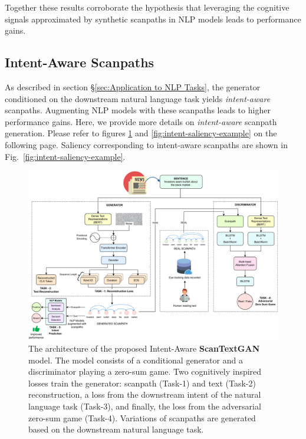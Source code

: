 Together these results corroborate the hypothesis that leveraging the cognitive signals approximated by synthetic scanpaths in NLP models leads to performance gains.



\subsection{Intent-Aware Scanpaths}
\label{sec:appendix_intent_aware_scanpaths}
As described in section \S\ref{sec:Application to NLP Tasks}, the generator conditioned on the downstream natural language task yields \textit{intent-aware} scanpaths. Augmenting NLP models with these scanpaths leads to higher performance gains. Here, we provide more details on \textit{intent-aware} scanpath generation.
Please refer to figures \ref{fig:intent-model} and \ref{fig:intent-saliency-example} on the following page. Saliency corresponding to intent-aware scanpaths are shown in Fig.~\ref{fig:intent-saliency-example}.



\begin{figure}[!t]
    \centering
    \includegraphics[width=\textwidth]{images/Intent_Scanpath_Figure.pdf}
    \caption{The architecture of the proposed Intent-Aware \textbf{ScanTextGAN} model. The model consists of a conditional generator and a discriminator playing a zero-sum game. Two cognitively inspired losses train the generator: scanpath (Task-1) and text (Task-2) reconstruction, a loss from the downstream intent of the natural language task (Task-3), and finally, the loss from the adversarial zero-sum game (Task-4). Variations of scanpaths are generated based on the downstream natural language task.}
    \label{fig:intent-model} 
\end{figure}


